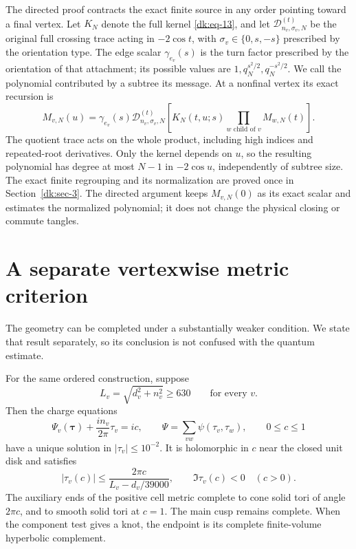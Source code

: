 The directed proof contracts the exact finite source in any order
pointing toward a final vertex. Let \(K_N\) denote the full kernel
\eqref{dk:eq-13}, and let \(\mathcal D_{n_v,\sigma_v,N}^{(t)}\)
be the original full crossing trace acting in \(-2\cos t\), with
\(\sigma_v\in\{0,s,-s\}\) prescribed by the orientation type.
The edge scalar $\gamma_{e_v}(s)$ is the turn factor prescribed by
the orientation of that attachment; its possible values are
$1,q_N^{s^2/2},q_N^{-s^2/2}$. We call the polynomial contributed
by a subtree its message. At a nonfinal vertex its exact recursion is
\begin{equation}\label{eq:local-recursion}
 M_{v,N}(u)=\gamma_{e_v}(s)
 \mathcal D_{n_v,\sigma_v,N}^{(t)}
 \left[K_N(t,u;s)\prod_{w\text{ child of }v}M_{w,N}(t)\right].
\end{equation}
The quotient trace acts on the whole product, including high indices
and repeated-root derivatives. Only the kernel depends on \(u\), so
the resulting polynomial has degree at most \(N-1\) in
\(-2\cos u\), independently of subtree size. The exact finite
regrouping and its normalization are proved once in
Section~\ref{dk:sec-3}. The directed argument keeps
\(M_{v,N}(0)\) as its exact scalar and estimates the normalized
polynomial; it does not change the physical closing or commute tangles.

\section{A separate vertexwise metric criterion}

The geometry can be completed under a substantially weaker condition.
We state that result separately, so its conclusion is not confused
with the quantum estimate.

\begin{theorem}
\label{thm:vertexwise-geometry}
For the same ordered construction, suppose
\begin{equation}\label{eq:vertexwise-criterion}
 L_v=\sqrt{d_v^2+n_v^2}\ge630\qquad\text{for every }v.
\end{equation}
Then the charge equations
\begin{equation}\label{eq:vertexwise-charge}
 \Psi_v(\boldsymbol\tau)+\frac{in_v}{2\pi}\tau_v=ic,
 \qquad \Psi=\sum_{vw}\psi(\tau_v,\tau_w),\qquad 0\le c\le1
\end{equation}
have a unique solution in $|\tau_v|\le10^{-2}$. It is holomorphic
in $c$ near the closed unit disk and satisfies
\begin{equation}\label{eq:vertexwise-size-sign}
 |\tau_v(c)|\le
 \frac{2\pi c}{L_v-d_v/39000},\qquad
 \Im\tau_v(c)<0\quad(c>0).
\end{equation}
The auxiliary ends of the positive cell metric complete to cone solid tori of angle $2\pi c$,
and to smooth solid tori at $c=1$. The main cusp remains complete.
When the component test gives a knot, the endpoint is its complete
finite-volume hyperbolic complement.
\end{theorem}

